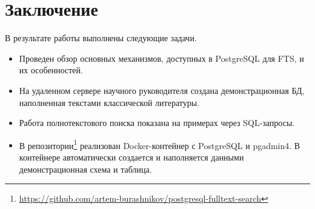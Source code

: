 
\section*{Заключение}

В результате работы выполнены следующие задачи.

\begin{itemize}
    \item Проведен обзор основных механизмов, доступных в PostgreSQL для FTS, и их особенностей.
    \item На удаленном сервере научного руководителя создана демонстрационная БД, наполненная текстами классической литературы.
    \item Работа полнотекстового поиска показана на примерах через SQL-запросы.
    \item В репозитории\footnote{\href{https://github.com/artem-burashnikov/postgresql-fulltext-search}{https://github.com/artem-burashnikov/postgresql-fulltext-search}} реализован Docker-контейнер с PostgreSQL и pgadmin4.
          В контейнере автоматически создается и наполняется данными демонстрационная схема и таблица.
\end{itemize}
